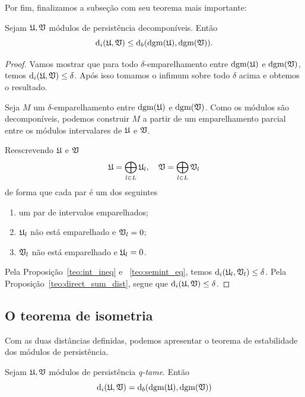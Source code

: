 Por fim, finalizamos a subseção com seu teorema mais importante:
\begin{teo}\label{teo:stb_decom}
    Sejam $\mathfrak{U}, \mathfrak{V}$ módulos de persistência decomponíveis. Então 
    \begin{equation*}
        \text{d}_i(\mathfrak{U}, \mathfrak{V}) \leq \text{d}_b(\text{dgm}(\mathfrak{U}), \text{dgm}(\mathfrak{V})).
    \end{equation*}
\end{teo}
\begin{proof}
    Vamos mostrar que para todo $\delta$-emparelhamento entre $\text{dgm}(\mathfrak{U})$
    e $\text{dgm}(\mathfrak{V})$, temos $\text{d}_i(\mathfrak{U}, \mathfrak{V}) \leq \delta$. Após isso 
    tomamos o infimum sobre todo $\delta$ acima e obtemos o resultado. 

    Seja $M$ um $\delta$-emparelhamento entre $\text{dgm}(\mathfrak{U})$ e $\text{dgm}(\mathfrak{V})$. 
    Como os módulos são decomponíveis, podemos construir $M$ a partir de um
    emparelhamento parcial entre os módulos intervalares de $\mathfrak{U}$ e $\mathfrak{V}$.
    
    Reescrevendo $\mathfrak{U}$ e $\mathfrak{V}$
    \begin{equation*}
        \mathfrak{U} = \bigoplus_{l\in L} \mathfrak{U}_l, \quad \mathfrak{V} = \bigoplus_{l \in L} \mathfrak{V}_l
    \end{equation*}
    de forma que cada par é um dos seguintes
    \begin{enumerate}
        \item \label{en:match} um par de intervalos emparelhados;
        \item \label{en:unmatchU} $\mathfrak{U}_l$ não está emparelhado e $\mathfrak{V}_l = 0$;
        \item \label{en:unmatchV}$\mathfrak{V}_l$ não está emparelhado e $\mathfrak{U}_l = 0$.
    \end{enumerate}
    Pela Proposição~\ref{teo:int_ineq} e ~\ref{teo:semint_eq}, temos $\text{d}_i(\mathfrak{U}_l,
    \mathfrak{V}_l) \leq \delta$. Pela Proposição~\ref{teo:direct_sum_dist}, segue que $\text{d}_i(\mathfrak{U},
    \mathfrak{V}) \leq \delta$.
\end{proof}

\subsection{O teorema de isometria} 
Com as duas distâncias definidas, podemos apresentar o teorema de estabilidade 
dos módulos de persistência.

\begin{teo}\label{teo:stbtheo}
    Sejam $\mathfrak{U}, \mathfrak{V}$ módulos de persistência \textit{q-tame}. Então
    \begin{equation*}
        \text{d}_i(\mathfrak{U}, \mathfrak{V}) = \text{d}_b(\text{dgm}(\mathfrak{U}), \text{dgm}(\mathfrak{V}))
    \end{equation*}
\end{teo}

